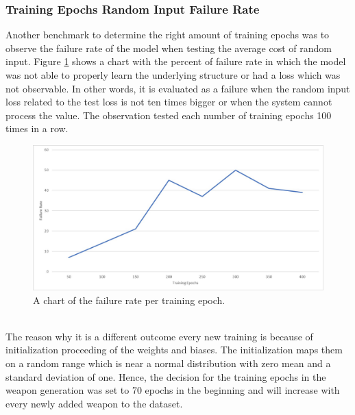 \documentclass[MGS,Master,english]{twbook}%
\begin{document}
\subsubsection{Training Epochs Random Input Failure Rate}
Another benchmark to determine the right amount of training epochs was to observe the failure rate of the model when testing the average cost of random input. Figure \ref{fig::vae::epochsFailureRate} shows a chart with the percent of failure rate in which the model was not able to properly learn the underlying structure or had a loss which was not observable. In other words, it is evaluated as a failure when the random input loss related to the test loss is not ten times bigger or when the system cannot process the value. The observation tested each number of training epochs 100 times in a row. 
\begin{figure}[!ht]
	\centering
	\includegraphics[width=1.0\linewidth]{PICs/trained_vae/epoch_failure_rate}
	\caption{A chart of the failure rate per training epoch.} \label{fig::vae::epochsFailureRate}
\end{figure}\\
The reason why it is a different outcome every new training is because of initialization proceeding of the weights and biases. The initialization maps them on a random range which is near a normal distribution with zero mean and a standard deviation of one. Hence, the decision for the training epochs in the weapon generation was set to 70 epochs in the beginning and will increase with every newly added weapon to the dataset.
\end{document}
